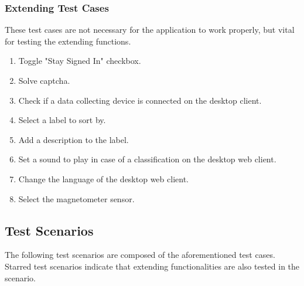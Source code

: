 \subsubsection{Extending Test Cases}
These test cases are not necessary for the application to work properly, but vital for testing the extending functions. 
\begin{enumerate}[resume*]
    \item Toggle "Stay Signed In" checkbox.
    \item Solve captcha.
    \item Check if a data collecting device is connected on the desktop client.
    \item Select a label to sort by.
    \item Add a description to the label.
    \item Set a sound to play in case of a classification on the desktop web client.
    \item Change the language of the desktop web client.
    \item Select the magnetometer sensor.
\end{enumerate}

\subsection{Test Scenarios}
The following test scenarios are composed of the aforementioned test cases. Starred test scenarios indicate that extending functionalities are also tested in the scenario.
